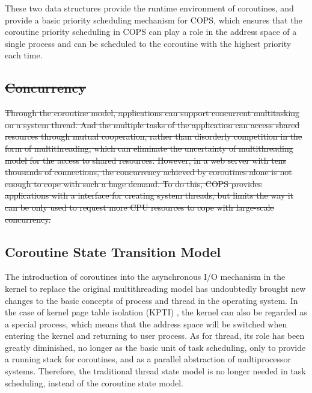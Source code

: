 \documentclass[sigconf,review,anonymous]{acmart}
\providecommand{\DIFdel}[1]{{\protect\color{red}\sout{#1}}}                      %
\providecommand{\DIFdelbegin}{} %
\providecommand{\DIFdelend}{} %
\begin{document}
These two data structures provide the runtime environment of coroutines, and provide a basic priority scheduling mechanism for COPS, which ensures that the coroutine priority scheduling in COPS can play a role in the address space of a single process and can be scheduled to the coroutine with the highest priority each time.

\DIFdelbegin \subsection{\DIFdel{Concurrency}}
\addtocounter{subsection}{-1}%

\DIFdel{Through the coroutine model, applications can support concurrent multitasking on a system thread. And the multiple tasks of the application can access shared resources through mutual cooperation, rather than disorderly competition in the form of multithreading, which can eliminate the uncertainty of multithreading model for the access to shared resources. However, in a web server with tens thousands of connections, the concurrency achieved by coroutines alone is not enough to cope with such a huge demand. To do this, COPS provides applications with a interface for creating system threads, but limits the way it can be only used to request more CPU resources to cope with large-scale concurrency. 
}%

\DIFdelend \subsection{Coroutine State Transition Model}
\label{section: state-transition}

The introduction of coroutines into the asynchronous I/O mechanism in the kernel to replace the original multithreading model has undoubtedly brought new changes to the basic concepts of process and thread in the operating system. In the case of kernel page table isolation (KPTI) \cite{kpti}, the kernel can also be regarded as a special process, which means that the address space will be switched when entering the kernel and returning to user process. As for thread, its role has been greatly diminished, no longer as the basic unit of task scheduling, only to provide a running stack for coroutines, and as a parallel abstraction of multiprocessor systems. Therefore, the traditional thread state model is no longer needed in task scheduling, instead of the coroutine state model.
\end{document}
